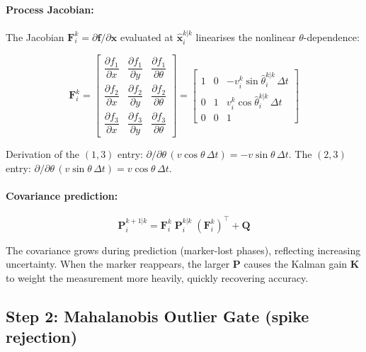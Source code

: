 \documentclass[12pt,a4paper]{article}
\begin{document}
\paragraph{Process Jacobian:}
The Jacobian $\bm{F}_i^k = \partial\bm{f}/\partial\bm{x}$ evaluated at
$\hat{\bm{x}}_i^{k|k}$ linearises the nonlinear $\theta$-dependence:
\begin{mathbox}
\begin{equation}
  \bm{F}_i^k =
  \begin{bmatrix}
    \dfrac{\partial f_1}{\partial x} & \dfrac{\partial f_1}{\partial y} & \dfrac{\partial f_1}{\partial \theta} \\[10pt]
    \dfrac{\partial f_2}{\partial x} & \dfrac{\partial f_2}{\partial y} & \dfrac{\partial f_2}{\partial \theta} \\[10pt]
    \dfrac{\partial f_3}{\partial x} & \dfrac{\partial f_3}{\partial y} & \dfrac{\partial f_3}{\partial \theta}
  \end{bmatrix}
  =
  \begin{bmatrix}
    1 & 0 & -v_i^k \sin\hat{\theta}_i^{k|k} \,\Delta t \\
    0 & 1 &  v_i^k \cos\hat{\theta}_i^{k|k} \,\Delta t \\
    0 & 0 & 1
  \end{bmatrix}
  \label{eq:F}
\end{equation}
\end{mathbox}

Derivation of the $(1,3)$ entry:
$\partial/\partial\theta\,(v\cos\theta\,\Delta t) = -v\sin\theta\,\Delta t$.
The $(2,3)$ entry: $\partial/\partial\theta\,(v\sin\theta\,\Delta t) = v\cos\theta\,\Delta t$.

\paragraph{Covariance prediction:}
\begin{mathbox}
\begin{equation}
  \bm{P}_i^{k+1|k} = \bm{F}_i^k \; \bm{P}_i^{k|k} \; (\bm{F}_i^k)^\top + \bm{Q}
  \label{eq:pred_cov}
\end{equation}
\end{mathbox}

The covariance grows during prediction (marker-lost phases), reflecting increasing
uncertainty. When the marker reappears, the larger $\bm{P}$ causes the Kalman
gain $\bm{K}$ to weight the measurement more heavily, quickly recovering accuracy.

\subsection{Step 2: Mahalanobis Outlier Gate (spike rejection)}
\label{sec:gate}
\end{document}
